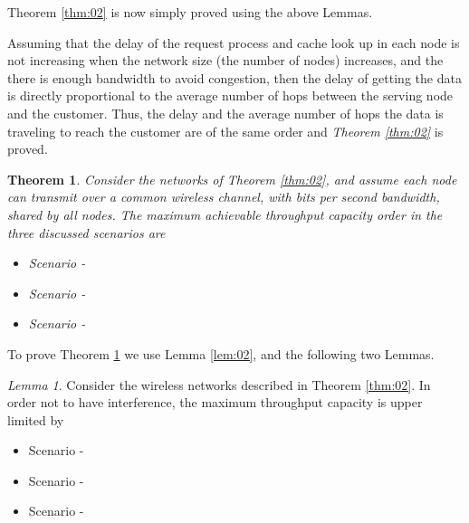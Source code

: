 \documentclass[journal]{IEEEtran}
\theoremstyle{plain}
\newtheorem{theorem}{Theorem}
\theoremstyle{remark}
\newtheorem{lemma}{Lemma}
\begin{document}
	Theorem \ref{thm:02} is now simply proved using the above Lemmas.

\begin{IEEEproof}
Assuming that the delay of the request process and cache look up in each node is not increasing when the network size (the number of nodes) increases, and the there is enough bandwidth to avoid congestion, then the delay of getting the data is directly proportional to the average number of hops between the serving node and the customer. Thus, the delay and the average number of hops the data is traveling to reach the customer are of the same order and \textit{Theorem \ref{thm:02}} is proved.
\end{IEEEproof}

\begin{theorem}\label{thm:03}
Consider the networks of Theorem \ref{thm:02}, and assume each node can transmit over a common wireless channel, with  bits per second bandwidth, shared by all nodes. The maximum achievable throughput capacity order   in the three discussed scenarios are
	
	\begin{itemize}
		\item Scenario - 
		
		
		
		\item Scenario - 
				
		
		\item Scenario -	
		
		
		\end{itemize}
\end{theorem}

To prove Theorem \ref{thm:03} we use Lemma \ref{lem:02}, and the following two Lemmas.

\begin{lemma}\label{lem:03}
	Consider the wireless networks described in Theorem \ref{thm:02}. In order not to have interference, the maximum throughput capacity is upper limited by  
	
	\begin{itemize}
		\item Scenario - 
		
		
		
		\item Scenario - 
			
		
		\item Scenario -	
		
		
		\end{itemize}
\end{lemma}	
		
\end{document}
